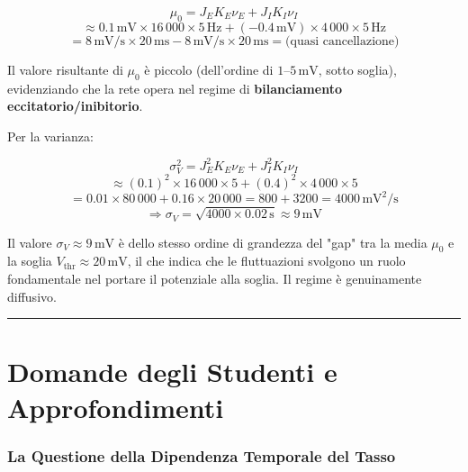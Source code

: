\begin{equation}
\mu_0 = J_E K_E \nu_E + J_I K_I \nu_I
\end{equation}
\begin{equation}
\approx 0.1\,\text{mV} \times 16\,000 \times 5\,\text{Hz} + (-0.4\,\text{mV}) \times 4\,000 \times 5\,\text{Hz}
\end{equation}
\begin{equation}
= 8\,\text{mV/s} \times 20\,\text{ms} - 8\,\text{mV/s} \times 20\,\text{ms} = \text{(quasi cancellazione)}
\end{equation}

Il valore risultante di $\mu_0$ è piccolo (dell'ordine di $1$–$5\,\text{mV}$, sotto soglia), evidenziando che la rete opera nel regime di \textbf{bilanciamento eccitatorio/inibitorio}.

Per la varianza:

\begin{equation}
\sigma_V^2 = J_E^2 K_E \nu_E + J_I^2 K_I \nu_I
\end{equation}
\begin{equation}
\approx (0.1)^2 \times 16\,000 \times 5 + (0.4)^2 \times 4\,000 \times 5
\end{equation}
\begin{equation}
= 0.01 \times 80\,000 + 0.16 \times 20\,000 = 800 + 3200 = 4000\,\text{mV}^2/\text{s}
\end{equation}
\begin{equation}
\Rightarrow \sigma_V = \sqrt{4000 \times 0.02\,\text{s}} \approx 9\,\text{mV}
\end{equation}

Il valore $\sigma_V \approx 9\,\text{mV}$ è dello stesso ordine di grandezza del "gap" tra la media $\mu_0$ e la soglia $V_{\text{thr}} \approx 20\,\text{mV}$, il che indica che le fluttuazioni svolgono un ruolo fondamentale nel portare il potenziale alla soglia. Il regime è genuinamente diffusivo.

\vspace{0.5cm}
\noindent\rule{\textwidth}{0.4pt}
\vspace{0.5cm}

\section{Domande degli Studenti e Approfondimenti}

\subsubsection{La Questione della Dipendenza Temporale del Tasso}

